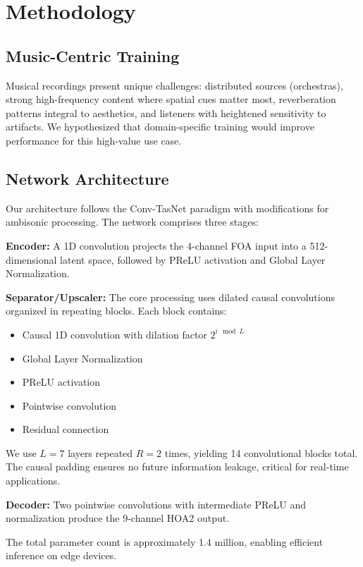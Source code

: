 \documentclass[10pt,twocolumn]{article}
\begin{document}
\section{Methodology}

\subsection{Music-Centric Training}

Musical recordings present unique challenges: distributed sources (orchestras), strong high-frequency content where spatial cues matter most, reverberation patterns integral to aesthetics, and listeners with heightened sensitivity to artifacts. We hypothesized that domain-specific training would improve performance for this high-value use case.

\subsection{Network Architecture}

Our architecture follows the Conv-TasNet paradigm with modifications for ambisonic processing. The network comprises three stages:

\textbf{Encoder:} A 1D convolution projects the 4-channel FOA input into a 512-dimensional latent space, followed by PReLU activation and Global Layer Normalization.

\textbf{Separator/Upscaler:} The core processing uses dilated causal convolutions organized in repeating blocks. Each block contains:
\begin{itemize}
    \item Causal 1D convolution with dilation factor $2^{i \mod L}$
    \item Global Layer Normalization
    \item PReLU activation
    \item Pointwise convolution
    \item Residual connection
\end{itemize}

We use $L=7$ layers repeated $R=2$ times, yielding 14 convolutional blocks total. The causal padding ensures no future information leakage, critical for real-time applications.

\textbf{Decoder:} Two pointwise convolutions with intermediate PReLU and normalization produce the 9-channel HOA2 output.

The total parameter count is approximately 1.4 million, enabling efficient inference on edge devices.
\end{document}
